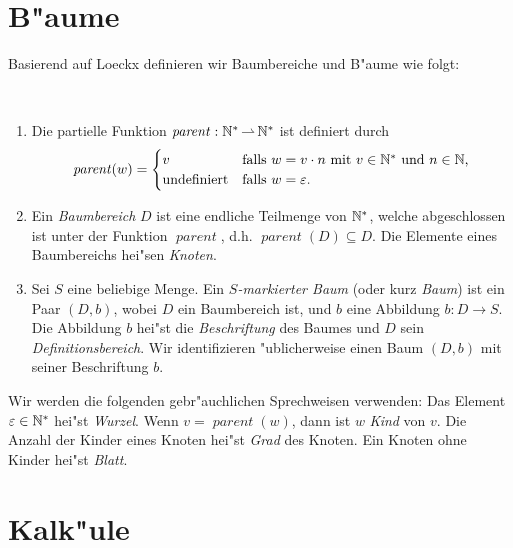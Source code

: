 \documentclass[12pt,a4paper,final]{article}
\DeclareMathOperator{\parent}{\mathit{parent}}
\begin{document}

\section{B"aume}
\label{sec:Baeume}

Basierend auf Loeckx \ETAL \cite[S.~43]{DBLP:books/teu/LoeckxMW86} definieren
wir Baumbereiche und B"aume wie folgt:

\begin{definition} \
  \begin{enumerate}
  \item Die partielle Funktion \mbox{$\parent:\N^* \pto \N^*$} ist definiert durch
    \begin{equation*}
      \parent(w) = 
      \begin{cases}
        v
        & \text{falls $w = v \cdot n$ mit $v \in \N^*$ und $n \in \N$,} \\
        \text{undefiniert}
        & \text{falls $w = \varepsilon$.}
      \end{cases}
    \end{equation*}

  \item Ein \emph{Baumbereich} $D$ ist eine endliche Teilmenge von $\mathbb N^*$, welche
    abgeschlossen ist unter der Funktion $\parent$, d.h. \mbox{$\parent(D) \subseteq D$}.
    Die Elemente eines Baumbereichs hei"sen \emph{Knoten}.

  \item Sei $S$ eine beliebige Menge. Ein \emph{$S$-markierter Baum} (oder kurz \emph{Baum})
    ist ein Paar \mbox{$(D,b)$}, wobei $D$ ein Baumbereich ist, und $b$ eine Abbildung
    \mbox{$b:D \to S$}. Die Abbildung $b$ hei"st die \emph{Beschriftung} des
    Baumes und $D$ sein \emph{Definitionsbereich}.
    Wir identifizieren "ublicherweise einen Baum $(D,b)$ mit seiner Beschriftung $b$.
  \end{enumerate}
\end{definition}
Wir werden die folgenden gebr"auchlichen Sprechweisen verwenden: Das Element
\mbox{$\varepsilon \in \mathbb N^*$} hei"st \emph{Wurzel}. Wenn $v = \parent(w)$, dann
ist $w$ \emph{Kind} von $v$. Die Anzahl der Kinder eines Knoten hei"st
\emph{Grad} des Knoten. Ein Knoten ohne Kinder hei"st \emph{Blatt}.



\section{Kalk"ule}
\label{sec:Kalkuele}
\end{document}
